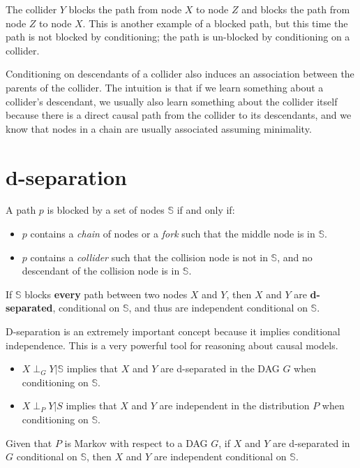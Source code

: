 The collider $Y$ blocks the path from node $X$ to node $Z$ and blocks the path
from node $Z$ to node $X$. This is another example of a blocked path, but this
time the path is not blocked by conditioning; the path is un-blocked by conditioning
on a collider.

Conditioning on descendants of a collider also induces an association between the
parents of the collider. The intuition is that if we learn something about a
collider's descendant, we usually also learn something about the collider itself
because there is a direct causal path from the collider to its descendants, and
we know that nodes in a chain are usually associated assuming minimality.
\section{d-separation}
\begin{definition}
    A path $p$ is blocked by a set of nodes $\mathbb{S}$ if and only if:
    \begin{itemize}
        \item $p$ contains a \textit{chain} of nodes or a \textit{fork} such that
              the middle node is in $\mathbb{S}$.
        \item $p$ contains a \textit{collider} such that the collision node is
              not in $\mathbb{S}$, and no descendant of the collision node is in
              $\mathbb{S}$.
    \end{itemize}
    If $\mathbb{S}$ blocks \textbf{every} path between two nodes $X$ and $Y$, then
    $X$ and $Y$ are \textbf{d-separated}, conditional on $\mathbb{S}$, and thus
    are independent conditional on $\mathbb{S}$.
\end{definition}
D-separation is an extremely important concept because it implies conditional
independence. This is a very powerful tool for reasoning about causal models.
\begin{itemize}
    \item $X \perp_G Y | \mathbb{S}$ implies that $X$ and $Y$ are d-separated in the DAG
          $G$ when conditioning on $\mathbb{S}$.
    \item $X \perp_P Y | S$ implies that $X$ and $Y$ are independent in the
          distribution $P$ when conditioning on $\mathbb{S}$.
\end{itemize}
\begin{definition}
    Given that $P$ is Markov with respect to a DAG $G$, if $X$ and $Y$ are d-separated
    in $G$ conditional on $\mathbb{S}$, then $X$ and $Y$ are independent conditional
    on $\mathbb{S}$.
\end{definition}

